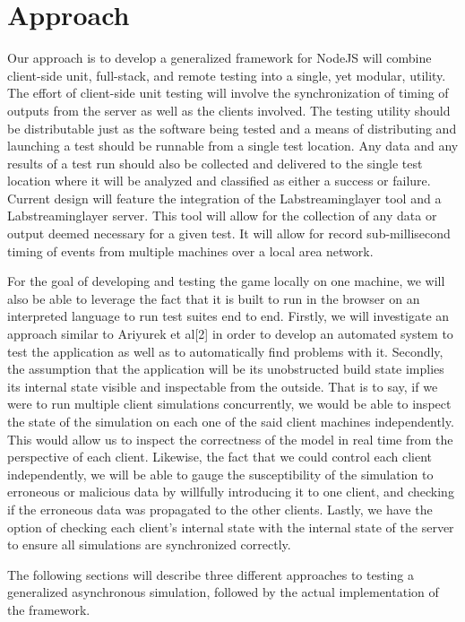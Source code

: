 \documentclass[conference]{IEEEtran}
\begin{document}
\section{Approach}
Our approach is to develop a generalized framework for NodeJS will combine client-side unit, full-stack, and remote testing into a single, yet modular, 
utility. The effort of client-side unit testing will involve the synchronization of timing of outputs from the server as well as the clients involved. The testing utility 
should be distributable just as the software being tested and a means of distributing and launching a test should be runnable from a single test location. Any data and 
any results of a test run should also be collected and delivered to the single test location where it will be analyzed and classified as either a success or failure. 
Current design will feature the integration of the Labstreaminglayer tool and a Labstreaminglayer server. This tool will allow for the collection of any data or output 
deemed necessary for a given test. It will allow for record sub-millisecond timing of events from multiple machines over a local area network.

For the goal of developing and testing the game locally on one machine, we will also be able to leverage the fact that it is built to run in the browser on
an interpreted language to run test suites end to end. Firstly, we will investigate an approach similar to Ariyurek et al[2] in order to develop an automated 
system to test the application as well as to automatically find problems with it. Secondly, the assumption that the application will be its unobstructed build state implies
its internal state visible and inspectable from the outside. That is to say, if we were to run multiple client simulations concurrently, we would be able to inspect 
the state of the simulation on each one of the said client machines independently. This would allow us to inspect the correctness of the model in real time from the 
perspective of each client. Likewise, the fact that we could control each client independently, we will be able to gauge the susceptibility of the simulation to erroneous 
or malicious data by willfully introducing it to one client, and checking if the erroneous data was propagated to the other clients. Lastly, we have the option of checking
each client's internal state with the internal state of the server to ensure all simulations are synchronized correctly.

The following sections will describe three different approaches to testing a generalized asynchronous simulation, followed by the actual implementation of the framework.
\end{document}
